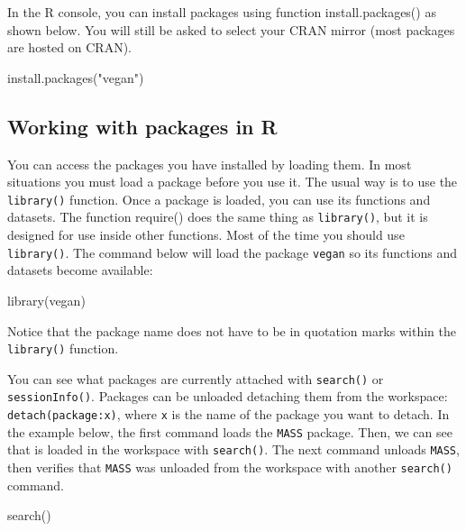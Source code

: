 \documentclass[
  13,
  letterpaper,
]{report}
\newenvironment{Shaded}{\begin{snugshade}}{\end{snugshade}}
\newcommand{\FunctionTok}[1]{\textcolor[rgb]{0.28,0.35,0.67}{#1}}
\newcommand{\NormalTok}[1]{\textcolor[rgb]{0.00,0.23,0.31}{#1}}
\newcommand{\StringTok}[1]{\textcolor[rgb]{0.13,0.47,0.30}{#1}}
\begin{document}
In the R console, you can install packages using function
install.packages() as shown below. You will still be asked to select
your CRAN mirror (most packages are hosted on CRAN).

\begin{Shaded}
\begin{Highlighting}[]
\FunctionTok{install.packages}\NormalTok{(}\StringTok{"vegan"}\NormalTok{)}
\end{Highlighting}
\end{Shaded}

\subsection{Working with packages in R}\label{sec-02-pack-work}

You can access the packages you have installed by loading them. In most
situations you must load a package before you use it. The usual way is
to use the \texttt{library()} function. Once a package is loaded, you
can use its functions and datasets. The function require() does the same
thing as \texttt{library()}, but it is designed for use inside other
functions. Most of the time you should use \texttt{library()}. The
command below will load the package \texttt{vegan} so its functions and
datasets become available:

\begin{Shaded}
\begin{Highlighting}[]
\FunctionTok{library}\NormalTok{(vegan)}
\end{Highlighting}
\end{Shaded}

Notice that the package name does not have to be in quotation marks
within the \texttt{library()} function.

You can see what packages are currently attached with \texttt{search()}
or \texttt{sessionInfo()}. Packages can be unloaded detaching them from
the workspace: \texttt{detach(package:x)}, where \texttt{x} is the name
of the package you want to detach. In the example below, the first
command loads the \texttt{MASS} package. Then, we can see that is loaded
in the workspace with \texttt{search()}. The next command unloads
\texttt{MASS}, then verifies that \texttt{MASS} was unloaded from the
workspace with another \texttt{search()} command.

\begin{Shaded}
\begin{Highlighting}[]
\FunctionTok{search}\NormalTok{()}
\end{Highlighting}
\end{Shaded}
\end{document}
